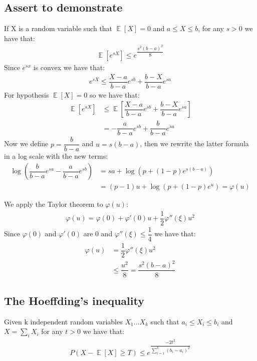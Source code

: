 \documentclass[10pt,a4paper]{book}
\DeclareMathOperator{\E}{\mathbb{E}}
\begin{document}
		\subsection{Assert to demonstrate}
		If X is a random variable such that $ \E \left[ X \right] = 0 $ and $ a \leq X  \leq b $, for any $ s > 0 $ we have that:\\
		\begin{align*}
		\E \left[ e^{sX} \right] \leq e^{\dfrac{s^2(b-a)^2}{8}}
		\end{align*}
		Since $ e^{sx} $ is convex we have that:
		\begin{align*}
			e^{sX} \leq \dfrac{X -a }{b-a} e^{sb} + \dfrac{b-X}{b-a} e^{sa} 
 		\end{align*}
 		For hypothesis $ \E \left[X\right]  = 0$ so we have that:\\
 		\begin{align*}
 		  \E \left[e^{sX} \right] &\leq  \E \left[ \dfrac{X -a }{b-a} e^{sb} + \dfrac{b-X}{b-a} e^{sa}  \right] \\
 		  &= -\dfrac{a }{b-a} e^{sb} + \dfrac{b}{b-a} e^{sa}
 		\end{align*}
 		Now we define $ p = \dfrac{b}{b-a} $ and $ u = s(b-a) $, then we rewrite the latter formula in a log  scale with the new terms:
 		\begin{align*}
 		 		\log \left(   \dfrac{b}{b-a} e^{sa}  -\dfrac{a }{b-a} e^{sb} \right) 
 		 				&= sa + \log \left(p + (1 - p)e^{s(b-a)}\right) \\
 		 		&= (p-1) u + \log(p+(1-p) e^u) = \varphi(u)
 		\end{align*}
 		
		We apply the Taylor theorem to $ \varphi(u) $:
\begin{align*}
\varphi(u) = \varphi(0) + \varphi'(0) u + \dfrac{1}{2} \varphi''(\xi)u^2
\end{align*}
Since $ \varphi(0) $ and $ \varphi'(0) $ are 0 and $ \varphi''(\xi)  \leq \dfrac{1}{4}$ we have that:\\
\begin{align*}
\varphi(u) &= \dfrac{1}{2} \varphi''(\xi)u^2 \\
&\leq \dfrac{u^2}{8} = \dfrac{s^2(b-a)^2}{8}
\end{align*}
		\subsection{The Hoeffding's inequality}
		Given k independent random variables $ X_1 \dots X_k $ such that $ a_i \leq X_i \leq b_i $ and $ X = \sum_i X_i $ for any $ t > 0 $ we have that:
		\begin{align*}
			P(X - \E\left[X\right] \geq T) \leq e^{\dfrac{-2t^2}{\sum_{i=1}^{k} (b_i - a_i)^2}}
		\end{align*}
\end{document}
